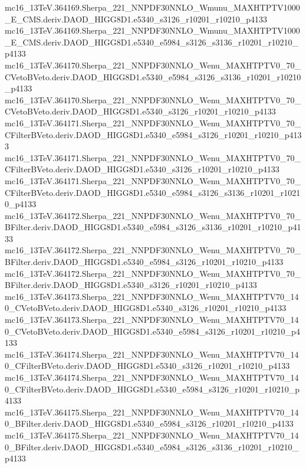 mc16_13TeV.364169.Sherpa_221_NNPDF30NNLO_Wmunu_MAXHTPTV1000_E_CMS.deriv.DAOD_HIGG8D1.e5340_s3126_r10201_r10210_p4133 \\
mc16_13TeV.364169.Sherpa_221_NNPDF30NNLO_Wmunu_MAXHTPTV1000_E_CMS.deriv.DAOD_HIGG8D1.e5340_e5984_s3126_s3136_r10201_r10210_p4133 \\
mc16_13TeV.364170.Sherpa_221_NNPDF30NNLO_Wenu_MAXHTPTV0_70_CVetoBVeto.deriv.DAOD_HIGG8D1.e5340_e5984_s3126_s3136_r10201_r10210_p4133 \\
mc16_13TeV.364170.Sherpa_221_NNPDF30NNLO_Wenu_MAXHTPTV0_70_CVetoBVeto.deriv.DAOD_HIGG8D1.e5340_s3126_r10201_r10210_p4133 \\
mc16_13TeV.364171.Sherpa_221_NNPDF30NNLO_Wenu_MAXHTPTV0_70_CFilterBVeto.deriv.DAOD_HIGG8D1.e5340_e5984_s3126_r10201_r10210_p4133 \\
mc16_13TeV.364171.Sherpa_221_NNPDF30NNLO_Wenu_MAXHTPTV0_70_CFilterBVeto.deriv.DAOD_HIGG8D1.e5340_s3126_r10201_r10210_p4133 \\
mc16_13TeV.364171.Sherpa_221_NNPDF30NNLO_Wenu_MAXHTPTV0_70_CFilterBVeto.deriv.DAOD_HIGG8D1.e5340_e5984_s3126_s3136_r10201_r10210_p4133 \\
mc16_13TeV.364172.Sherpa_221_NNPDF30NNLO_Wenu_MAXHTPTV0_70_BFilter.deriv.DAOD_HIGG8D1.e5340_e5984_s3126_s3136_r10201_r10210_p4133 \\
mc16_13TeV.364172.Sherpa_221_NNPDF30NNLO_Wenu_MAXHTPTV0_70_BFilter.deriv.DAOD_HIGG8D1.e5340_e5984_s3126_r10201_r10210_p4133 \\
mc16_13TeV.364172.Sherpa_221_NNPDF30NNLO_Wenu_MAXHTPTV0_70_BFilter.deriv.DAOD_HIGG8D1.e5340_s3126_r10201_r10210_p4133 \\
mc16_13TeV.364173.Sherpa_221_NNPDF30NNLO_Wenu_MAXHTPTV70_140_CVetoBVeto.deriv.DAOD_HIGG8D1.e5340_s3126_r10201_r10210_p4133 \\
mc16_13TeV.364173.Sherpa_221_NNPDF30NNLO_Wenu_MAXHTPTV70_140_CVetoBVeto.deriv.DAOD_HIGG8D1.e5340_e5984_s3126_r10201_r10210_p4133 \\
mc16_13TeV.364174.Sherpa_221_NNPDF30NNLO_Wenu_MAXHTPTV70_140_CFilterBVeto.deriv.DAOD_HIGG8D1.e5340_s3126_r10201_r10210_p4133 \\
mc16_13TeV.364174.Sherpa_221_NNPDF30NNLO_Wenu_MAXHTPTV70_140_CFilterBVeto.deriv.DAOD_HIGG8D1.e5340_e5984_s3126_r10201_r10210_p4133 \\
mc16_13TeV.364175.Sherpa_221_NNPDF30NNLO_Wenu_MAXHTPTV70_140_BFilter.deriv.DAOD_HIGG8D1.e5340_e5984_s3126_r10201_r10210_p4133 \\
mc16_13TeV.364175.Sherpa_221_NNPDF30NNLO_Wenu_MAXHTPTV70_140_BFilter.deriv.DAOD_HIGG8D1.e5340_e5984_s3126_s3136_r10201_r10210_p4133 \\
